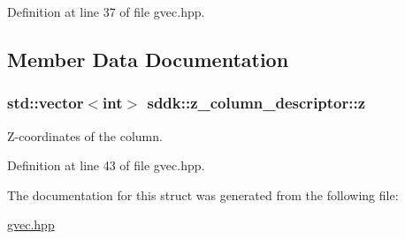 Definition at line 37 of file gvec.\+hpp.



\subsection{Member Data Documentation}
\hypertarget{structsddk_1_1z__column__descriptor_aa60ceb8eb444412ef771710bbae208fd}{}
\subsubsection[{z}]{\setlength{\rightskip}{0pt plus 5cm}std\+::vector$<$int$>$ sddk\+::z\+\_\+column\+\_\+descriptor\+::z}\label{structsddk_1_1z__column__descriptor_aa60ceb8eb444412ef771710bbae208fd}


Z-\/coordinates of the column. 



Definition at line 43 of file gvec.\+hpp.



The documentation for this struct was generated from the following file\+:\begin{DoxyCompactItemize}
\item 
\hyperlink{gvec_8hpp}{gvec.\+hpp}\end{DoxyCompactItemize}
